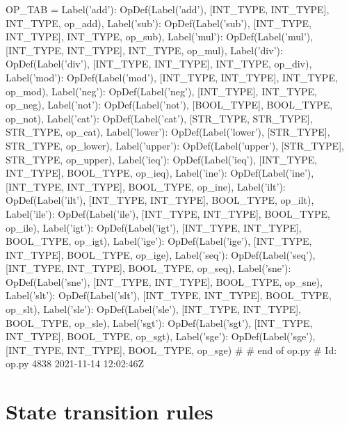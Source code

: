 \begin{dispPy}
OP_TAB = {
    Label('add'): OpDef(Label('add'), [INT_TYPE, INT_TYPE], INT_TYPE, op_add),
    Label('sub'): OpDef(Label('sub'), [INT_TYPE, INT_TYPE], INT_TYPE, op_sub),
    Label('mul'): OpDef(Label('mul'), [INT_TYPE, INT_TYPE], INT_TYPE, op_mul),
    Label('div'): OpDef(Label('div'), [INT_TYPE, INT_TYPE], INT_TYPE, op_div),
    Label('mod'): OpDef(Label('mod'), [INT_TYPE, INT_TYPE], INT_TYPE, op_mod),
    Label('neg'): OpDef(Label('neg'), [INT_TYPE], INT_TYPE, op_neg),
    Label('not'): OpDef(Label('not'), [BOOL_TYPE], BOOL_TYPE, op_not),
    Label('cat'): OpDef(Label('cat'), [STR_TYPE, STR_TYPE], STR_TYPE, op_cat),
    Label('lower'): OpDef(Label('lower'), [STR_TYPE], STR_TYPE, op_lower),
    Label('upper'): OpDef(Label('upper'), [STR_TYPE], STR_TYPE, op_upper),
    Label('ieq'): OpDef(Label('ieq'), [INT_TYPE, INT_TYPE], BOOL_TYPE, op_ieq),
    Label('ine'): OpDef(Label('ine'), [INT_TYPE, INT_TYPE], BOOL_TYPE, op_ine),
    Label('ilt'): OpDef(Label('ilt'), [INT_TYPE, INT_TYPE], BOOL_TYPE, op_ilt),
    Label('ile'): OpDef(Label('ile'), [INT_TYPE, INT_TYPE], BOOL_TYPE, op_ile),
    Label('igt'): OpDef(Label('igt'), [INT_TYPE, INT_TYPE], BOOL_TYPE, op_igt),
    Label('ige'): OpDef(Label('ige'), [INT_TYPE, INT_TYPE], BOOL_TYPE, op_ige),
    Label('seq'): OpDef(Label('seq'), [INT_TYPE, INT_TYPE], BOOL_TYPE, op_seq),
    Label('sne'): OpDef(Label('sne'), [INT_TYPE, INT_TYPE], BOOL_TYPE, op_sne),
    Label('slt'): OpDef(Label('slt'), [INT_TYPE, INT_TYPE], BOOL_TYPE, op_slt),
    Label('sle'): OpDef(Label('sle'), [INT_TYPE, INT_TYPE], BOOL_TYPE, op_sle),
    Label('sgt'): OpDef(Label('sgt'), [INT_TYPE, INT_TYPE], BOOL_TYPE, op_sgt),
    Label('sge'): OpDef(Label('sge'), [INT_TYPE, INT_TYPE], BOOL_TYPE, op_sge)}
#
# end of op.py
# Id: op.py 4838 2021-11-14 12:02:46Z 
\end{dispPy}

\section{State transition rules}

